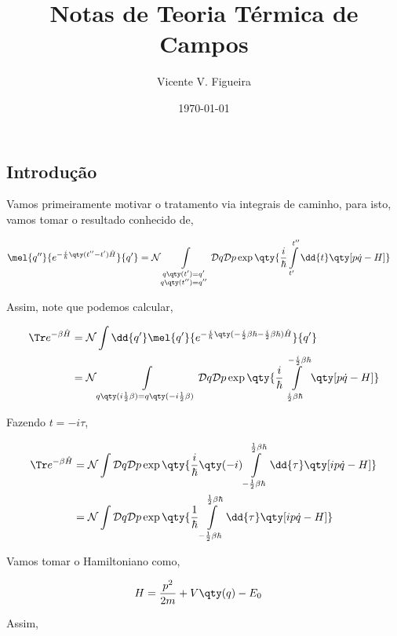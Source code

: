 \documentclass[twoside]{amsart}
\title{
Notas de Teoria Térmica de Campos
}
\author{
  Vicente V. Figueira
       }
\date{\today}
\numberwithin{equation}{section}
\newcommand{\Dd}[1]{\mathcal D #1}
\begin{document}
\maketitle

\tableofcontents


\begin{refsection}
\section{Introdução}

Vamos primeiramente motivar o tratamento via integrais de caminho, para isto, vamos tomar o resultado conhecido de,

\begin{align}
    \mel{q''}{e^{-\frac{i}{\hbar}\qty(t''-t')\hat H}}{q'}&=\mathcal N\int\limits_{\substack{q\qty(t')=q'\\q\qty(t'')=q''}}\Dd{q}\Dd{p}\exp\qty{\frac i\hbar\int\limits_{t'}^{t''}\dd{t}\qty[p\dot q-H]}
\end{align}

Assim, note que podemos calcular,

\begin{align}
    \Tr e^{-\beta \hat H}&=\mathcal N\int\dd{q'}\mel{q'}{e^{-\frac i\hbar\qty(-\frac i2\beta \hbar-\frac i2\beta \hbar)\hat H}}{q'}\\
    &=\mathcal N\int\limits_{\substack{q\qty(i\frac12\beta)=q\qty(-i\frac12\beta)}}\Dd{q}\Dd{p}\exp\qty{\frac i\hbar\int\limits_{\frac i2\beta\hbar}^{-\frac i2\beta \hbar}\qty[p\dot q-H]}
\end{align}

Fazendo $t=-i\tau$,

\begin{align}
    \Tr e^{-\beta\hat H}&=\mathcal N\int\Dd{q}\Dd{p}\exp\qty{\frac i\hbar\qty(-i)\int\limits_{-\frac12\beta\hbar}^{\frac12\beta\hbar}\dd{\tau}\qty[ip\dot q-H]}\\
    &=\mathcal N\int\Dd{q}\Dd{p}\exp\qty{\frac1\hbar\int\limits_{-\frac12\beta\hbar}^{\frac12\beta\hbar}\dd{\tau}\qty[ip\dot q-H]}
\end{align}

Vamos tomar o Hamiltoniano como,

\begin{align}
    H&=\frac{p^2}{2m}+V\qty(q)-E_0
\end{align}

Assim,


\end{refsection}
\end{document}
